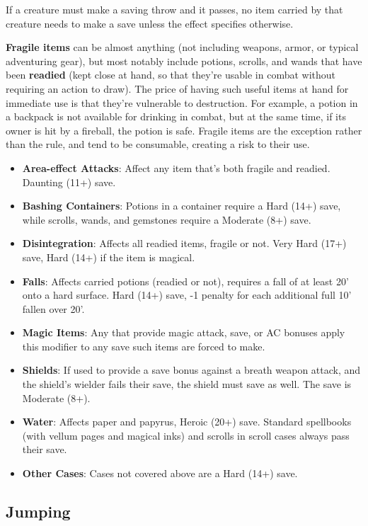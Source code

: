 \documentclass{article}
\begin{document}
\begin{multicols}{2}
If a creature must make a saving throw and it passes, no item carried by
that creature needs to make a save unless the effect specifies
otherwise.

\textbf{Fragile items} can be almost anything (not including weapons,
armor, or typical adventuring gear), but most notably include potions,
scrolls, and wands that have been \textbf{readied} (kept close at hand,
so that they're usable in combat without requiring an action to draw).
The price of having such useful items at hand for immediate use is that
they're vulnerable to destruction. For example, a potion in a backpack
is not available for drinking in combat, but at the same time, if its
owner is hit by a fireball, the potion is safe. Fragile items are the
exception rather than the rule, and tend to be consumable, creating a
risk to their use.

\begin{itemize}
\tightlist
\item
  \textbf{Area-effect Attacks}: Affect any item that's both fragile and
  readied. Daunting (11+) save.
\item
  \textbf{Bashing Containers}: Potions in a container require a Hard
  (14+) save, while scrolls, wands, and gemstones require a Moderate
  (8+) save.
\item
  \textbf{Disintegration}: Affects all readied items, fragile or not.
  Very Hard (17+) save, Hard (14+) if the item is magical.
\item
  \textbf{Falls}: Affects carried potions (readied or not), requires a
  fall of at least 20' onto a hard surface. Hard (14+) save, -1 penalty
  for each additional full 10' fallen over 20'.
\item
  \textbf{Magic Items}: Any that provide magic attack, save, or AC
  bonuses apply this modifier to any save such items are forced to make.
\item
  \textbf{Shields}: If used to provide a save bonus against a breath
  weapon attack, and the shield's wielder fails their save, the shield
  must save as well. The save is Moderate (8+).
\item
  \textbf{Water}: Affects paper and papyrus, Heroic (20+) save. Standard
  spellbooks (with vellum pages and magical inks) and scrolls in scroll
  cases always pass their save.
\item
  \textbf{Other Cases}: Cases not covered above are a Hard (14+) save.
\end{itemize}

\subsection{Jumping}\label{jumping}


\end{multicols}
\end{document}
